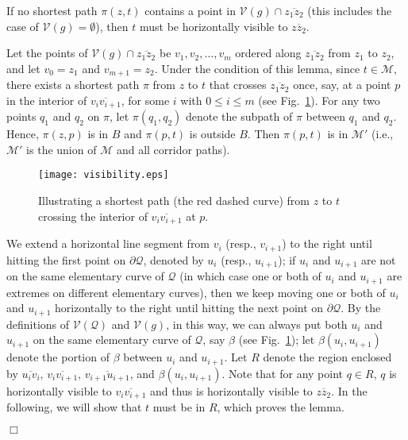 \documentclass[english,runningheads,11pt]{llncs}
\def\calM{\mathcal{M}}
\def\calQ{\mathcal{Q}}
\def\calV{\mathcal{V}}
\newenvironment{proof}{\noindent {\textbf{Proof:}}\rm}{\hfill $\Box$\rm}
\begin{document}
\begin{lemma}\label{lem:160}
If no shortest path $\pi(z,t)$ contains a point in
$\calV(g)\cap \overline{z_1z_2}$ (this includes the case of $\calV(g)=\emptyset$), then
$t$ must be horizontally visible to $\overline{zz_2}$.
\end{lemma}
\begin{proof}
Let the points of $\calV(g)\cap \overline{z_1z_2}$ be
$v_1,v_2,\ldots,v_m$ ordered along $\overline{z_1z_2}$ from $z_1$ to
$z_2$, and let $v_0=z_1$ and $v_{m+1}=z_2$. Under the condition of this lemma, since
$t \in \calM$, there exists a shortest path
$\pi$ from $z$ to $t$ that crosses $\overline{z_1z_2}$ once, say, at a point $p$ in
the interior of $\overline{v_iv_{i+1}}$,
for some $i$ with $0\leq i\leq m$ (see Fig.~\ref{fig:visibility}).
For any two points $q_1$ and $q_2$
on $\pi$, let $\pi(q_1,q_2)$ denote the subpath of $\pi$ between
$q_1$ and $q_2$. Hence, $\pi(z,p)$ is in $B$ and $\pi(p,t)$ is outside $B$. Then
$\pi(p,t)$ is in $\calM'$ (i.e., $\calM'$ is the union of $\calM$ and all corridor paths).


\begin{figure}[t]
\begin{minipage}[t]{\linewidth}
\begin{center}
\texttt{[image: visibility.eps]}
\caption{\footnotesize Illustrating a shortest path (the red dashed curve) from
$z$ to $t$ crossing the interior of $\overline{v_iv_{i+1}}$ at $p$.}
\label{fig:visibility}
\end{center}
\end{minipage}
\vspace*{-0.15in}
\end{figure}



We extend a horizontal line segment from $v_i$ (resp., $v_{i+1}$) to the right until
hitting the first point on $\partial\calQ$, denoted by $u_i$ (resp., $u_{i+1}$);
if $u_i$ and $u_{i+1}$ are not on the same elementary curve of
$\calQ$ (in which case
one or both of $u_i$ and $u_{i+1}$ are extremes on different
elementary curves),
then we keep moving one or both of $u_i$ and $u_{i+1}$ horizontally
to the right until hitting the next point on $\partial\calQ$.
By the definitions of $\calV(\calQ)$ and $\calV(g)$, in this way,
we can always put both $u_i$ and $u_{i+1}$ on the same
elementary curve of $\calQ$, say $\beta$ (see Fig.~\ref{fig:visibility}); let
$\beta(u_i,u_{i+1})$ denote the
portion of $\beta$ between $u_i$ and $u_{i+1}$. Let $R$ denote the
region enclosed by $\overline{u_iv_i}$, $\overline{v_iv_{i+1}}$,
$\overline{v_{i+1}u_{i+1}}$, and $\beta(u_i,u_{i+1})$. Note that for
any point $q\in R$, $q$ is horizontally visible to
$\overline{v_iv_{i+1}}$ and thus is horizontally visible to
$\overline{zz_2}$.
In the following, we will show that $t$ must be in $R$, which proves the lemma.



\end{proof}
\end{document}

